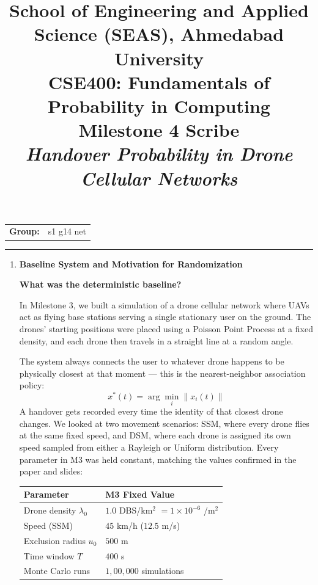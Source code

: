 \documentclass[11pt]{article}
\title{
    \normalsize School of Engineering and Applied Science (SEAS), Ahmedabad University \\
    \vspace{0.2cm}
    \textbf{CSE400: Fundamentals of Probability in Computing}\\
    \Large Milestone 4 Scribe\\
    \large \textit{Handover Probability in Drone Cellular Networks}
}
\author{}
\date{}
\newcommand{\subquestion}[1]{
    \vspace{0.3cm}
    \noindent\textbf{#1}
    \vspace{0.1cm}
}
\begin{document}
\maketitle

\vspace{-2cm}
\begin{center}
    \begin{tabular}{ll}
        \textbf{Group:} & {s1 g14 net\hspace{3in}}
    \end{tabular}
\end{center}

\hrule
\vspace{0.5cm}

\begin{enumerate}[label=\textbf{Scribe Question \arabic*:}, leftmargin=*, itemsep=1.5em]

\item \textbf{Baseline System and Motivation for Randomization}

\subquestion{What was the deterministic baseline?}

In Milestone 3, we built a simulation of a drone cellular network where UAVs act as flying base
stations serving a single stationary user on the ground. The drones' starting positions were placed
using a Poisson Point Process at a fixed density, and each drone then travels in a straight line at a
random angle.

The system always connects the user to whatever drone happens to be physically closest at that
moment --- this is the nearest-neighbor association policy:
\[
x^*(t) = \arg\min_i \|x_i(t)\|
\]
A handover gets recorded every time the identity of that closest drone changes. We looked at two
movement scenarios: SSM, where every drone flies at the same fixed speed, and DSM, where each
drone is assigned its own speed sampled from either a Rayleigh or Uniform distribution. Every
parameter in M3 was held constant, matching the values confirmed in the paper and slides:

\vspace{0.3cm}
\begin{center}
\begin{tabular}{ll}
    \toprule
    \textbf{Parameter} & \textbf{M3 Fixed Value} \\
    \midrule
    Drone density $\lambda_0$ & $1.0$ DBS/km$^2$ $= 1 \times 10^{-6}$ /m$^2$ \\
    Speed (SSM) & $45$ km/h ($12.5$ m/s) \\
    Exclusion radius $u_0$ & $500$ m \\
    Time window $T$ & $400$ s \\
    Monte Carlo runs & $1{,}00{,}000$ simulations \\
    \bottomrule
\end{tabular}
\end{center}
\vspace{0.3cm}


\end{enumerate}
\end{document}
